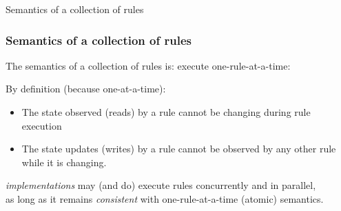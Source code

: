 \begin{frame}

\begin{center}
  {\LARGE Semantics of a collection of rules}
\end{center}

\end{frame}


\begin{frame}[fragile]
\frametitle{Semantics of a collection of rules}

\footnotesize

The semantics of a collection of {\BSV} rules is: execute one-rule-at-a-time:

\begin{center}
\end{center}

By definition (because one-at-a-time):
\begin{itemize}

 \item The state observed (reads) by a rule cannot be changing during rule execution

 \item The state updates (writes) by a rule cannot be observed by any
       other rule while it is changing.
\end{itemize}

\begin{center}
\end{center}

\PAUSE{\vspace{2ex}}

{\BSV} \emph{implementations} may (and do) execute rules concurrently and in parallel, \\
as long as it remains \emph{consistent} with one-rule-at-a-time (atomic) semantics.


\end{frame}
